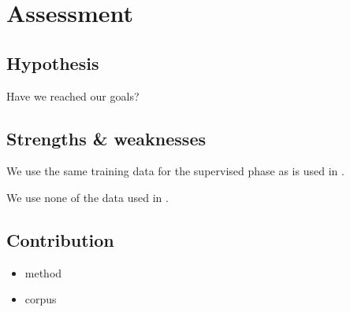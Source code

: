 \chapter{Assessment}
\label{chp:assessment}

\section{Hypothesis}
Have we reached our goals?
\section{Strengths \& weaknesses}
We use the same training data for the supervised phase as is used in
\cite{dik2008,dik2008}. 

We use none of the data used in \cite{mambrini2012}.
\section{Contribution}
\begin{itemize}
\item method
\item corpus
\end{itemize}

